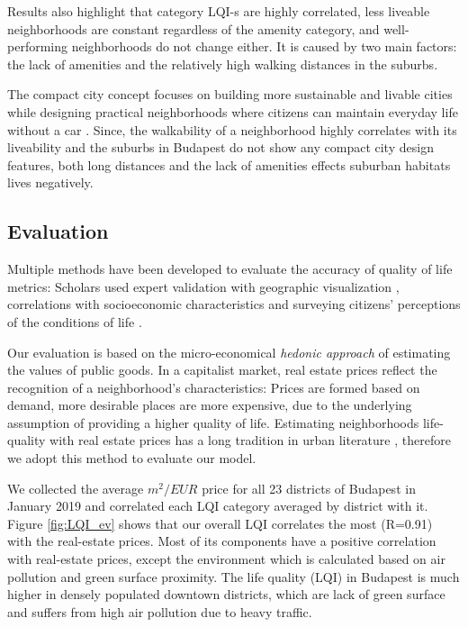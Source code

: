 Results also highlight that category LQI-s are highly correlated, less liveable neighborhoods are constant regardless of the amenity category, and well-performing neighborhoods do not change either. It is caused by two main factors: the lack of amenities and the relatively high walking distances in the suburbs.

The compact city concept focuses on building more sustainable and livable cities while designing practical neighborhoods where citizens can maintain everyday life without a car \cite{Dittmar2012}. Since, the walkability of a neighborhood highly correlates with its liveability \cite{Rogers2011} and the suburbs in Budapest do not show any compact city design features, both long distances and the lack of amenities effects suburban habitats lives negatively.

\subsection{Evaluation}

Multiple methods have been developed to evaluate the accuracy of quality of life metrics: Scholars used expert validation with geographic visualization \cite{Rinner2007,Gavrilidis}, correlations with socioeconomic characteristics \cite{Talen} and surveying citizens’ perceptions of the conditions of life \cite{Santos}.

Our evaluation is based on the micro-economical {\it hedonic approach} of estimating the values of public goods. In a capitalist market, real estate prices reflect the recognition of a neighborhood's characteristics: Prices are formed based on demand, more desirable places are more expensive, due to the underlying assumption of providing a higher quality of life. \cite{Brueckner1999} Estimating neighborhoods life-quality with real estate prices has a long tradition in urban literature \cite{Roback,Hoehn,Lora}, therefore we adopt this method to evaluate our model.

We collected the average $m^{2}/EUR$ price for all 23 districts of Budapest in January 2019 \cite{real_price} and correlated each LQI category averaged by district with it. Figure \ref{fig:LQI_ev} shows that our overall LQI correlates the most (R=0.91) with the real-estate prices. Most of its components have a positive correlation with real-estate prices, except the environment which is calculated based on air pollution and green surface proximity. The life quality (LQI) in Budapest is much higher in densely populated downtown districts, which are lack of green surface and suffers from high air pollution due to heavy traffic.

